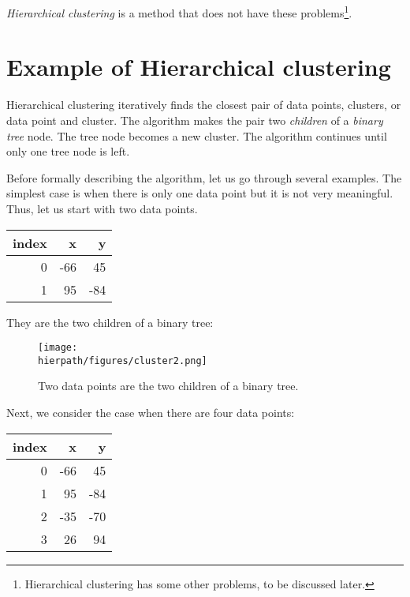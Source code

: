 
{\it Hierarchical clustering} is a method that does
  not have these problems\footnote{Hierarchical clustering has some
    other problems, to be discussed later.}.

\section{Example of 
Hierarchical clustering}

Hierarchical clustering iteratively finds the closest pair of data
points, clusters, or data point and cluster. The algorithm makes the
pair two {\it children} of a {\it binary tree}
node.  The tree node becomes a new cluster.  The
algorithm continues until only one tree node is left.

Before formally describing the algorithm, let us go through several
examples.  The simplest case is when there is only one data point but
it is not very meaningful. Thus, let us start with two data points.

\begin{table}[h]
\begin{tt}
\begin{tabular}{|r|rr|} \hline
{\bf index} &  {\bf x} & {\bf y} \\ \hline
0 &  -66  &  45 \\
1 & 95  &  -84 \\ \hline
\end{tabular}
\end{tt}
\end{table}

They are the two children of a binary tree:

\begin{figure}[h] \centering
{\texttt{[image: \\hierpath/figures/cluster2.png]}}
\caption{Two data points are the two children of a binary tree. }
\label{fig:hierarchical:cluster2}
\end{figure}

Next, we consider the case when there are four data points:

\begin{table}[h]
\begin{tt}
\begin{tabular}{|r|rr|} \hline
{\bf index} &  {\bf x} & {\bf y} \\ \hline
0 &  -66  &  45 \\
1 & 95  &  -84 \\
2 & -35  &  -70 \\
3 & 26  &  94 \\ \hline
\end{tabular}
\end{tt}
\end{table}


